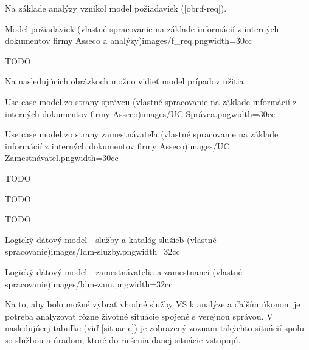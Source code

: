 Na základe analýzy vznikol model požiadaviek ([obr:f-req]).

{Model požiadaviek (vlastné spracovanie na základe informácií z interných dokumentov firmy Asseco a analýzy)}{images/f_req.png}{width=30cc}

\TODO
TODO

Na nasledujúcich obrázkoch možno vidieť model prípadov užitia.

{Use case model zo strany správcu (vlastné spracovanie na základe informácií z interných dokumentov firmy Asseco)}{images/UC Správca.png}{width=30cc}

{Use case model zo strany zamestnávateľa (vlastné spracovanie na základe informácií z interných dokumentov firmy Asseco)}{images/UC Zamestnávateľ.png}{width=30cc}


\TODO
TODO


\TODO
TODO


\TODO 
TODO


{Logický dátový model - služby a katalóg služieb (vlastné spracovanie)}{images/ldm-sluzby.png}{width=32cc}

{Logický dátový model - zamestnávatelia a zamestnanci (vlastné spracovanie)}{images/ldm-zam.png}{width=32cc}

Na to, aby bolo možné vybrať vhodné služby VS k analýze a ďalším úkonom je potreba analyzovať rôzne životné situácie spojené s verejnou správou. V nasledujúcej tabuľke (viď [situacie]) je zobrazený zoznam takýchto situácií spolu so službou a úradom, ktoré do riešenia danej situácie vstupujú.


  \setupTABLE[column][1][width=12cc]
  \setupTABLE[column][2][width=8cc]
  \setupTABLE[column][3][width=16cc]
  \setupTABLE[r][each][align={middle,lohi}]

